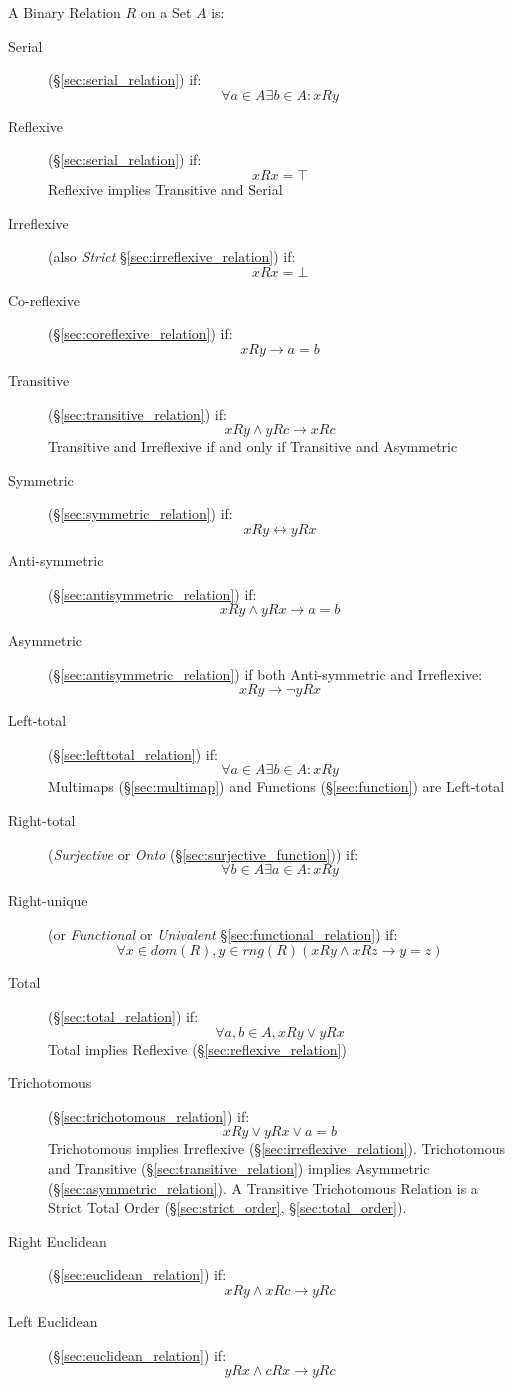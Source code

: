 A Binary Relation $R$ on a Set $A$ is:
\begin{description}
\item[Serial](\S\ref{sec:serial_relation}) if:
  \[
    \forall a \in A \exists b \in A : xRy
  \]
\item[Reflexive](\S\ref{sec:serial_relation}) if:
  \[
    xRx = \top
  \]
  Reflexive implies Transitive and Serial
\item[Irreflexive] (also \emph{Strict}
  \S\ref{sec:irreflexive_relation}) if:
  \[
    xRx = \bot
  \]
\item[Co-reflexive](\S\ref{sec:coreflexive_relation}) if:
  \[
    xRy \rightarrow a = b
  \]
\item[Transitive](\S\ref{sec:transitive_relation}) if:
  \[
    xRy \wedge yRc \rightarrow xRc
  \]
  Transitive and Irreflexive if and only if Transitive and Asymmetric
\item[Symmetric](\S\ref{sec:symmetric_relation}) if:
  \[
    xRy \leftrightarrow yRx
  \]
\item[Anti-symmetric](\S\ref{sec:antisymmetric_relation}) if:
  \[
    xRy \wedge yRx \rightarrow a = b
  \]
\item[Asymmetric](\S\ref{sec:antisymmetric_relation}) if both
  Anti-symmetric and Irreflexive:
  \[
    xRy \rightarrow \neg yRx
  \]
\item[Left-total] (\S\ref{sec:lefttotal_relation}) if:
  \[
    \forall a \in A \exists b \in A : xRy
  \]
  Multimaps (\S\ref{sec:multimap}) and Functions
  (\S\ref{sec:function}) are Left-total
\item[Right-total] (\emph{Surjective} or \emph{Onto}
  (\S\ref{sec:surjective_function})) if:
  \[
    \forall b \in A \exists a \in A : xRy
  \]
\item[Right-unique] (or \emph{Functional} or \emph{Univalent}
  \S\ref{sec:functional_relation}) if:
  \[
    \forall x \in dom(R), y \in rng(R)
    (xRy \wedge xRz \rightarrow y = z)
  \]
\item[Total] (\S\ref{sec:total_relation}) if:
  \[
    \forall a,b \in A, xRy \vee yRx
  \]
  Total implies Reflexive (\S\ref{sec:reflexive_relation})
\item[Trichotomous] (\S\ref{sec:trichotomous_relation}) if:
  \[
    xRy \vee yRx \vee a = b
  \]
  Trichotomous implies Irreflexive (\S\ref{sec:irreflexive_relation}).
  Trichotomous and Transitive (\S\ref{sec:transitive_relation})
  implies Asymmetric (\S\ref{sec:asymmetric_relation}). A Transitive
  Trichotomous Relation is a Strict Total Order
  (\S\ref{sec:strict_order}, \S\ref{sec:total_order}).
\item[Right Euclidean] (\S\ref{sec:euclidean_relation}) if:
  \[
    xRy \wedge xRc \rightarrow yRc
  \]
\item[Left Euclidean] (\S\ref{sec:euclidean_relation}) if:
  \[
    yRx \wedge cRx \rightarrow yRc
  \]
\end{description}
